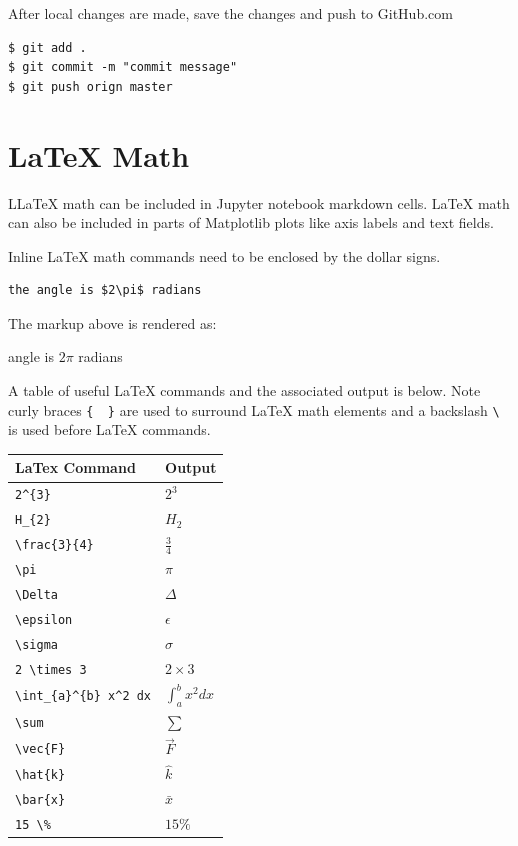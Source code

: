 \documentclass{book}
\begin{document}
After local changes are made, save the changes and push to GitHub.com

\begin{lstlisting}
$ git add .
$ git commit -m "commit message"
$ git push orign master
\end{lstlisting}
    




    
        \section{LaTeX Math}\label{latex-math}
    




    
        LLaTeX math can be included in Jupyter notebook markdown cells. LaTeX
math can also be included in parts of Matplotlib plots like axis labels
and text fields.

Inline LaTeX math commands need to be enclosed by the dollar signs.

\begin{lstlisting}
the angle is $2\pi$ radians
\end{lstlisting}

The markup above is rendered as:

angle is \(2\pi\) radians

A table of useful LaTeX commands and the associated output is below.
Note curly braces \lstinline!{  }! are used to surround LaTeX math
elements and a backslash \lstinline!\! is used before LaTeX commands.

\begin{longtable}[]{@{}ll@{}}
\toprule
LaTex Command & Output\tabularnewline
\midrule
\endhead
\lstinline!2^{3}! & \(2^{3}\)\tabularnewline
\lstinline!H_{2}! & \(H_{2}\)\tabularnewline
\lstinline!\frac{3}{4}! & \(\frac{3}{4}\)\tabularnewline
\lstinline!\pi! & \(\pi\)\tabularnewline
\lstinline!\Delta! & \(\Delta\)\tabularnewline
\lstinline!\epsilon! & \(\epsilon\)\tabularnewline
\lstinline!\sigma! & \(\sigma\)\tabularnewline
\lstinline!2 \times 3! & \(2 \times 3\)\tabularnewline
\lstinline!\int_{a}^{b} x^2 dx! & \(\int_{a}^{b} x^2 dx\)\tabularnewline
\lstinline!\sum! & \(\sum\)\tabularnewline
\lstinline!\vec{F}! & \(\vec{F}\)\tabularnewline
\lstinline!\hat{k}! & \(\hat{k}\)\tabularnewline
\lstinline!\bar{x}! & \(\bar{x}\)\tabularnewline
\lstinline!15 \%! & \(15 \%\)\tabularnewline
\bottomrule
\end{longtable}
    
\end{document}

